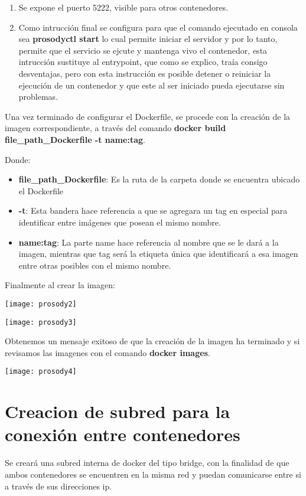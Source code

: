 \documentclass[10pt,letterpaper]{article}
\begin{document}
\begin{enumerate}
\item Se expone el puerto 5222, visible para otros contenedores.

\item Como intrucción final se configura para que el comando ejecutado en consola sea \textbf{prosodyctl start} lo cual permite iniciar el servidor y por lo tanto, permite que el servicio se ejcute y mantenga vivo el contenedor, esta intrucción sustituye al entrypoint, que como se explico, traía consigo desventajas, pero con esta instrucción es posible detener o reiniciar la ejecución de un contenedor y que este al ser iniciado pueda ejecutarse sin problemas.
\end{enumerate}

Una vez terminado de configurar el Dockerfile, se procede con la creación de la imagen correspondiente, a través del comando \textbf{docker build file\_path\_Dockerfile -t name:tag}.

Donde:

\begin{itemize}
\item \textbf{file\_path\_Dockerfile}: Es la ruta de la carpeta donde se encuentra ubicado el Dockerfile
\item \textbf{-t}: Esta bandera hace referencia a que se agregara un tag en especial para identificar entre imágenes que posean el mismo nombre.
\item \textbf{name:tag}: La parte name hace referencia al nombre que se le dará a la imagen, mientras que tag será la etiqueta única que identificará a esa imagen entre otras posibles con el mismo nombre.
\end{itemize}

Finalmente al crear la imagen:

\begin{center}
\texttt{[image: prosody2]}
\end{center}

\begin{center}
\texttt{[image: prosody3]}
\end{center}

Obtenemos un mensaje exitoso de que la creación de la imagen ha terminado y si revisamos las imagenes con el comando \textbf{docker images}.

\begin{center}
\texttt{[image: prosody4]}
\end{center}

\section{Creacion de subred para la conexión entre contenedores}
Se creará una subred interna de docker del tipo bridge, con la finalidad de que ambos contenedores se encuentren en la misma red y puedan comunicarse entre si a través de sus direcciones ip.
\end{document}

